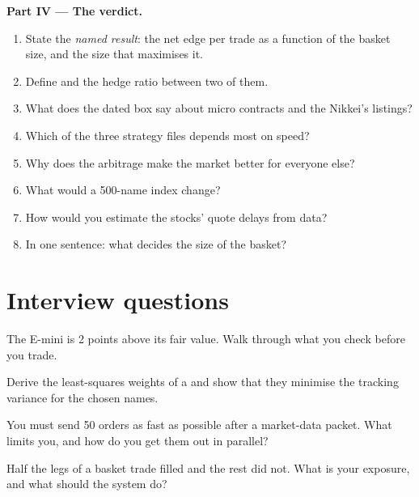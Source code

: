 \begin{problem}
\medskip\noindent\textbf{Part IV --- The verdict.}
\begin{enumerate}[resume]
\item State the \emph{named result}: the net edge per trade as a function of the basket size, and the size that maximises it.
\item Define  and the hedge ratio between two of them.
\item What does the dated box say about micro contracts and the Nikkei's listings?
\item Which of the three strategy files depends most on speed?
\item Why does the arbitrage make the market better for everyone else?
\item What would a 500-name index change?
\item How would you estimate the stocks' quote delays from data?
\item In one sentence: what decides the size of the basket?
\end{enumerate}
\end{problem}

\section{Interview questions}

\begin{interviewq}\label{iq:hf:index-and-basket-arbitrage:1}
The E-mini is 2 points above its fair value. Walk through what you check before you trade.
\end{interviewq}

\begin{interviewq}\label{iq:hf:index-and-basket-arbitrage:2}
Derive the least-squares weights of a  and show that they minimise the tracking variance for the chosen names.
\end{interviewq}

\begin{interviewq}\label{iq:hf:index-and-basket-arbitrage:3}
You must send 50 orders as fast as possible after a market-data packet. What limits you, and how do you get them out in parallel?
\end{interviewq}

\begin{interviewq}\label{iq:hf:index-and-basket-arbitrage:4}
Half the legs of a basket trade filled and the rest did not. What is your exposure, and what should the system do?
\end{interviewq}


